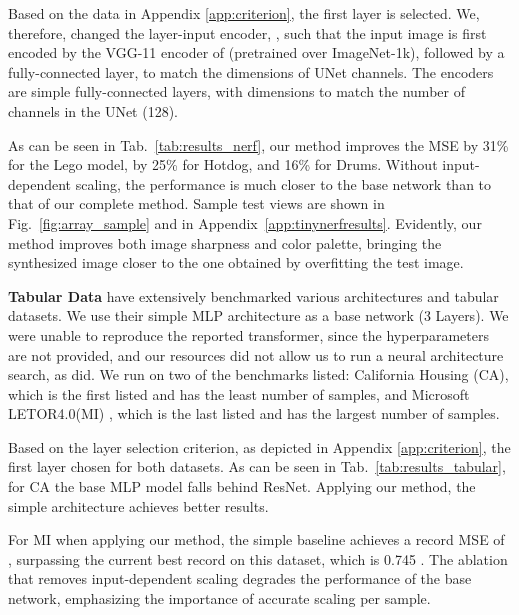 \documentclass{article}
\theoremstyle{plain}
\begin{document}
Based on the data in Appendix \ref{app:criterion}, the first layer is selected. We, therefore, changed the layer-input encoder, , such that the input image is first encoded by the VGG-11 encoder of \citet{vgg} (pretrained over ImageNet-1k), followed by a fully-connected layer, to match the dimensions of UNet channels. The encoders  are simple fully-connected layers, with dimensions to match the number of channels in the UNet (128).

As can be seen in Tab.~\ref{tab:results_nerf}, our method improves the MSE by 31\% for the Lego model, by 25\% for Hotdog, and 16\% for Drums. Without input-dependent scaling, the performance is much closer to the base network than to that of our complete method. Sample test views are shown in Fig.~\ref{fig:array_sample} and in Appendix~\ref{app:tinynerfresults}. Evidently, our method improves both image sharpness and color palette, bringing the synthesized image closer to the one obtained by overfitting the test image. 


{\bf Tabular Data\quad}
\citet{tabdata} have extensively benchmarked various architectures and tabular datasets. We use their simple MLP architecture as a base network (3 Layers). We were unable to reproduce the reported transformer, since the hyperparameters are not provided, and our resources did not allow us to run a neural architecture search, as \citet{tabdata} did. We run on two of the benchmarks listed: California Housing \citet{KELLEYPACE1997291} (CA), which is the first listed and has the least number of samples, and Microsoft LETOR4.0(MI) \citep{microsoft_dataset}, which is the last listed and has the largest number of samples. 

Based on the layer selection criterion, as depicted in Appendix \ref{app:criterion}, the first layer chosen for both datasets. As can be seen in Tab.~\ref{tab:results_tabular}, for CA the base MLP model falls behind ResNet. Applying our method, the simple architecture achieves better results. 

For MI when applying our method, the simple baseline achieves a record MSE of , surpassing the current best record on this dataset, which is 0.745 \citep{Popov2020Neural}. 
The ablation that removes input-dependent scaling degrades the performance of the base network, emphasizing the importance of accurate scaling per sample.
\end{document}
